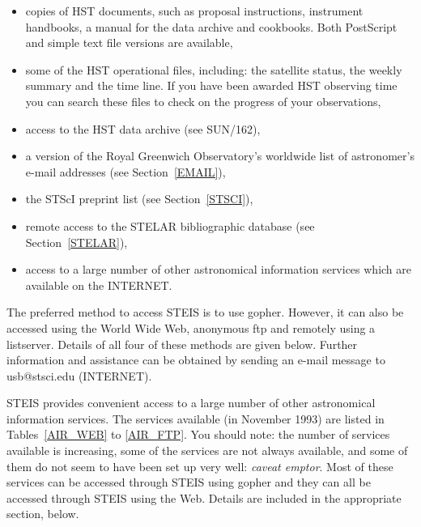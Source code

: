 \documentclass[twoside,11pt]{article}
\newcommand{\xref}[3]{#1}
\begin{document}
\begin{itemize}

  \item copies of HST documents, such as proposal instructions,
   instrument handbooks, a manual for the data archive and cookbooks.
   Both PostScript and simple text file versions are available,

  \item some of the HST operational files, including: the satellite
   status, the weekly summary and the time line. If you have been
   awarded HST observing time you can search these files to check on
   the progress of your observations,

  \item access to the HST data archive (see \xref{SUN/162}{sun162}{}),

  \item a version of the Royal Greenwich Observatory's worldwide list
   of astronomer's e-mail addresses (see Section~\ref{EMAIL}),

  \item the STScI preprint list (see Section~\ref{STSCI}),

  \item remote access to the STELAR bibliographic database (see
   Section~\ref{STELAR}),

  \item access to a large number of other astronomical information
   services which are available on the INTERNET.

\end{itemize}

The preferred method to access STEIS is to use gopher. However, it can
also be accessed using the World Wide Web, anonymous ftp and remotely
using a listserver. Details of all four of these methods are given
below. Further information and assistance can be obtained by sending an
e-mail message to usb@stsci.edu (INTERNET).

STEIS provides convenient access to a large number of other astronomical
information services. The services available (in November 1993) are
listed in Tables~\ref{AIR_WEB} to \ref{AIR_FTP}. You should note: the
number of services available is increasing, some of the services are not
always available, and some of them do not seem to have been set up very
well: {\it caveat emptor}. Most of these services can be accessed
through STEIS using gopher and they can all be accessed through STEIS
using the Web. Details are included in the appropriate section, below.
\end{document}
